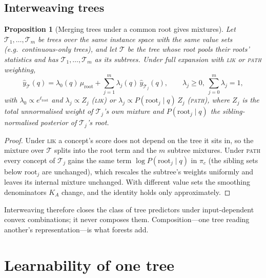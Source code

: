 \documentclass[11pt]{article}
\newtheorem{proposition}[theorem]{Proposition}
\theoremstyle{definition}
\theoremstyle{remark}
\newcommand{\T}{\mathcal{T}}
\newcommand{\hy}{\hat{y}}
\begin{document}
\subsection{Interweaving trees}

\begin{proposition}[Merging trees under a common root gives mixtures]\label{prop:interweave}
Let $\T_1,\dots,\T_m$ be trees over the same instance space with the same value sets
(e.g.\ continuous-only trees), and let $\T$ be the tree whose root pools their roots'
statistics and has $\T_1,\dots,\T_m$ as its subtrees.  Under full expansion with
\textsc{lik} or \textsc{path} weighting,
\[
  \hy_\T(q)=\lambda_0(q)\,\mu_{\text{root}}+\sum_{j=1}^m\lambda_j(q)\,\hy_{\T_j}(q),
  \qquad\lambda_j\ge0,\ \sum_{j=0}^m\lambda_j=1,
\]
with $\lambda_0\propto e^{\ell_{\text{root}}}$ and $\lambda_j\propto Z_j$ (\textsc{lik})
or $\lambda_j\propto P(\text{root}_j\mid q)\,Z_j$ (\textsc{path}), where $Z_j$ is the
total unnormalised weight of $\T_j$'s own mixture and $P(\text{root}_j\mid q)$ the
sibling-normalised posterior of $\T_j$'s root.
\end{proposition}
\begin{proof}
Under \textsc{lik} a concept's score does not depend on the tree it sits in, so the
mixture over $\T$ splits into the root term and the $m$ subtree mixtures.  Under
\textsc{path} every concept of $\T_j$ gains the same term $\log P(\text{root}_j\mid q)$
in $\pi_c$ (the sibling sets below $\text{root}_j$ are unchanged), which rescales the
subtree's weights uniformly and leaves its internal mixture unchanged.  With different
value sets the smoothing denominators $K_A$ change, and the identity holds only
approximately.
\end{proof}

Interweaving therefore closes the class of tree predictors under input-dependent
convex combinations; it never composes them.  Composition---one tree reading another's
representation---is what forests add.

\section{Learnability of one tree}\label{sec:learn}
\end{document}
